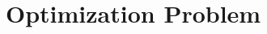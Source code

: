 \documentclass[paper=a4, fontsize=11pt]{scrartcl} %
\numberwithin{equation}{section} %
\numberwithin{figure}{section} %
\numberwithin{table}{section} %
\begin{document}





\section{Optimization Problem}

\end{document}
